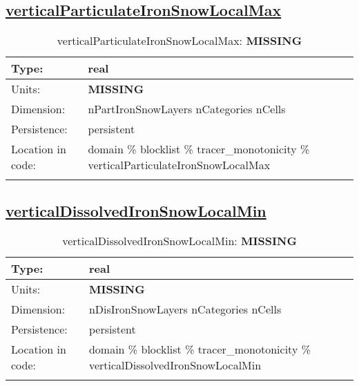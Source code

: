 \subsection[verticalParticulateIronSnowLocalMax]{\hyperref[sec:var_tab_tracer_monotonicity]{verticalParticulateIronSnowLocalMax}}
\label{subsec:var_sec_tracer_monotonicity_verticalParticulateIronSnowLocalMax}
\begin{center}
\begin{longtable}{| p{2.0in} | p{4.0in} |}
        \hline 
        Type: & real \\
        \hline 
        Units: & {\bf \color{red} MISSING} \\
        \hline 
        Dimension: & nPartIronSnowLayers nCategories nCells \\
        \hline 
        Persistence: & persistent \\
        \hline 
         Location in code: & domain \% blocklist \% tracer\_monotonicity \% verticalParticulateIronSnowLocalMax \\
         \hline 
    \caption{verticalParticulateIronSnowLocalMax: {\bf \color{red} MISSING}}
\end{longtable}
\end{center}
\subsection[verticalDissolvedIronSnowLocalMin]{\hyperref[sec:var_tab_tracer_monotonicity]{verticalDissolvedIronSnowLocalMin}}
\label{subsec:var_sec_tracer_monotonicity_verticalDissolvedIronSnowLocalMin}
\begin{center}
\begin{longtable}{| p{2.0in} | p{4.0in} |}
        \hline 
        Type: & real \\
        \hline 
        Units: & {\bf \color{red} MISSING} \\
        \hline 
        Dimension: & nDisIronSnowLayers nCategories nCells \\
        \hline 
        Persistence: & persistent \\
        \hline 
         Location in code: & domain \% blocklist \% tracer\_monotonicity \% verticalDissolvedIronSnowLocalMin \\
         \hline 
    \caption{verticalDissolvedIronSnowLocalMin: {\bf \color{red} MISSING}}
\end{longtable}
\end{center}
